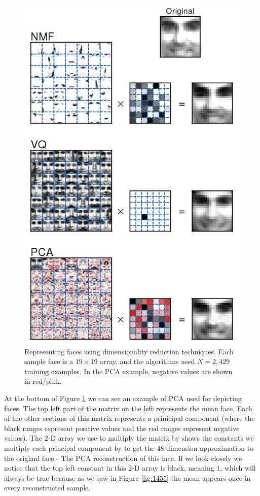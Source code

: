 \documentclass[a4paper]{article}
\begin{document}
\begin{figure}
\centering
\includegraphics[width=1.0\textwidth]{Figure1433.png}
\caption{\label{fig:1433} Representing faces using dimensionality reduction techniques. Each sample face is a $19\times 19$ array, and the algorithms used $N=2,429$ training examples.  In the PCA example, negative values are shown in red/pink.}
\end{figure}

At the bottom of Figure \ref{fig:1433} we can see an example of PCA used for depicting faces. The top left part of the matrix on the left represents the mean face. Each of the other sections of this matrix represents a prinicipal component (where the black ranges represent positive values and the red ranges represent negative values). The $2$-D array we use to multiply the matrix by shows the constants we multiply each principal component by to get the  $48$ dimension approximation to the origianl face - The PCA reconstruction of this face. If we look closely we notice that the top left constant in this $2$-D array is black, meaning $1$, which will always be true because as we saw in Figure \ref{fig:1455} the mean appears once in every reconstructed sample.
\end{document}
